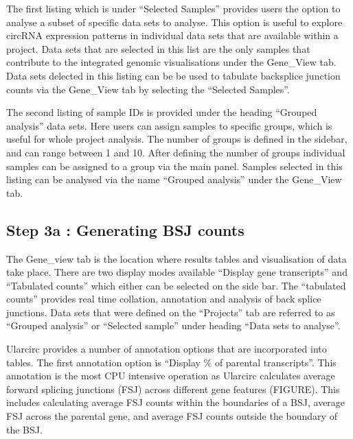 \documentclass[12pt]{article}\usepackage[]{graphicx}\usepackage[]{color}
\begin{document}
The first listing which is under ``Selected Samples'' provides users the option to analyse a subset of specific data sets to analyse. This option is useful to explore circRNA expression patterns in individual data sets that are available within a project. Data sets that are selected in this list are the only samples that contribute to the integrated genomic visualisations under the Gene\_View tab. Data sets delected in this listing can be be used to tabulate backsplice junction counts via the Gene\_View tab by selecting the ``Selected Samples''. \par

The second listing of sample IDs is provided under the heading ``Grouped analysis'' data sets. Here users can assign samples to specific groups, which is useful for whole project analysis. The number of groups is defined in the sidebar, and can range between 1 and 10. After defining the number of groups individual samples can be assigned to a group via the main panel. Samples selected in this listing can be analysed via the name ``Grouped analysis'' under the Gene\_View tab.


\subsection{Step 3a : Generating BSJ counts} \label{sec:Step3a}

\indent The Gene\_view tab is the location where results tables and visualisation of data take place. There are two display modes available ``Display gene transcripts'' and ``Tabulated counts'' which either can be selected on the side bar. The ``tabulated counts'' provides real time collation, annotation and analysis of back splice junctions. Data sets that were defined on the ``Projects'' tab are referred to as ``Grouped analysis'' or ``Selected sample'' under heading ``Data sets to analyse''. \par

Ularcirc provides a number of annotation options that are incorporated into tables. The first annotation option is ``Display \% of parental transcripts''. This annotation is the most CPU intensive operation as Ularcirc calculates average forward splicing junctions (FSJ) across different gene features (FIGURE). This includes calculating average FSJ counts within the boundaries of a BSJ, average FSJ across the parental gene, and average FSJ counts outside the boundary of the BSJ. \par
\end{document}
